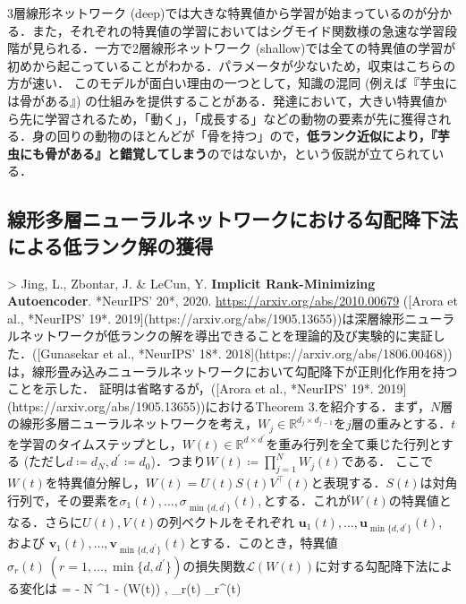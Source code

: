 3層線形ネットワーク (deep)では大きな特異値から学習が始まっているのが分かる．また，それぞれの特異値の学習においてはシグモイド関数様の急速な学習段階が見られる．一方で2層線形ネットワーク (shallow)では全ての特異値の学習が初めから起こっていることがわかる．パラメータが少ないため，収束はこちらの方が速い．
このモデルが面白い理由の一つとして，知識の混同 (例えば『芋虫には骨がある』) の仕組みを提供することがある．発達において，大きい特異値から先に学習されるため，「動く」，「成長する」などの動物の要素が先に獲得される．身の回りの動物のほとんどが「骨を持つ」ので，\textbf{低ランク近似により，『芋虫にも骨がある』と錯覚してしまう}のではないか，という仮説が立てられている．
\subsection{線形多層ニューラルネットワークにおける勾配降下法による低ランク解の獲得}
> Jing, L., Zbontar, J. & LeCun, Y. \textbf{Implicit Rank-Minimizing Autoencoder}. *NeurIPS' 20*, 2020. \url{https://arxiv.org/abs/2010.00679}
([Arora et al., *NeurIPS' 19*. 2019](https://arxiv.org/abs/1905.13655))は深層線形ニューラルネットワークが低ランクの解を導出できることを理論的及び実験的に実証した．([Gunasekar et al., *NeurIPS' 18*. 2018](https://arxiv.org/abs/1806.00468))は，線形畳み込みニューラルネットワークにおいて勾配降下が正則化作用を持つことを示した．
証明は省略するが，([Arora et al., *NeurIPS' 19*. 2019](https://arxiv.org/abs/1905.13655))におけるTheorem 3.を紹介する．まず，$N$層の線形多層ニューラルネットワークを考え，$W_j \in \mathbb{R}^{d_j \times d_{j−1}}$を$j$層の重みとする．$t$を学習のタイムステップとし，$W(t) \in \mathbb{R}^{d \times d^\prime}$を重み行列を全て乗じた行列とする (ただし$d \coloneqq d_N, d^\prime \coloneqq d_0$)．つまり$W(t)\coloneqq\prod_{j=1}^N W_j(t)$である．
ここで$W(t)$を特異値分解し，$W(t) = U(t)S(t)V^\top(t)$と表現する．$S(t)$は対角行列で，その要素を$\sigma_1(t), \ldots , \sigma_{\min\{d, d^\prime\}}(t),$とする．これが$W(t)$の特異値となる．さらに$U(t), V (t)$の列ベクトルをそれぞれ $\mathbf{u}_1(t), \ldots, \mathbf{u}_{\min\{d, d^\prime\}}(t)$, および $\mathbf{v}_1(t), \ldots, \mathbf{v}_{\min\{d,d^\prime \}}(t)$とする．このとき，特異値$ \sigma_r(t)\ (r=1, \ldots, \min\{d,d^\prime \})$の損失関数$\mathcal{L}(W(t))$に対する勾配降下法による変化は
 = - N \cdot {}^{1 - } \cdot \left\langle \nabla {}(W(t)) , _r(t) _r^\top(t) \right\rangle
